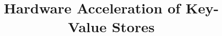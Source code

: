 \documentclass[conference]{IEEEtran}
\title{Hardware Acceleration of Key-Value Stores}
\author{
	\IEEEauthorblockN{Howard Mao}
	\IEEEauthorblockA{\email{zhemao@eecs.berkeley.edu}}
	\and
	\IEEEauthorblockN{Sagar Karandikar}
	\IEEEauthorblockA{\email{skarandikar@berkeley.edu}}
	\and
	\IEEEauthorblockN{Albert Ou}
	\IEEEauthorblockA{\email{aou@eecs.berkeley.edu}}
	\and
	\IEEEauthorblockN{Soumya Basu}
	\IEEEauthorblockA{\email{soumyab@berkeley.edu}}
}
\begin{document}
\maketitle




\nocite{*}
\printbibliography
\end{document}
